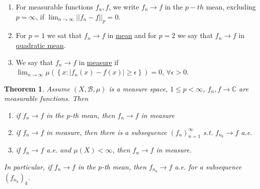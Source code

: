 \documentclass{article}
\newtheorem{theorem}{Theorem}[section]
\theoremstyle{definition}
\newcommand{\C}{\mathbb{C}}
\newcommand{\B}{\mathscr{B}}
\begin{document}
\begin{enumerate}
    \item For measurable functions $f_n,f$, we write $f_n\rightarrow f$ in the $p-th$ mean, excluding $p=\infty$, if $\lim_{n\rightarrow\infty}||f_n-f||_p=0$.
    \item For $p=1$ we sat that $f_n\rightarrow f$ in \underline{mean} and for $p=2$ we say that $f_n\rightarrow f$ in \underline{quadratic mean}.
    \item We say that $f_n\rightarrow f$ in \underline{measure} if $\lim_{n\rightarrow\infty}\mu(\left\{x:|f_n(x)-f(x)|\geq \epsilon\right\})=0$, $\forall \epsilon>0$.
\end{enumerate}

\begin{theorem}
    Assume $(X,\B,\mu)$ is a measure space, $1\leq p<\infty$, $f_n,f\rightarrow \C$ are measurable functions. Then
    \begin{enumerate}
        \item if $f_n\rightarrow f$ in the $p$-th mean, then $f_n\rightarrow f$ in measure 
        \item if $f_n\rightarrow f$ in measure, then there is a subsequence $(f_n)_{n=1}^\infty$ s.t. $f_{n_k}\rightarrow f$ a.e.
        \item if $f_n\rightarrow f$ a.e. and $\mu(X)<\infty$, then $f_n\rightarrow f$ in measure.
    \end{enumerate}
    In particular, if $f_n\rightarrow f$ in the $p$-th mean, then $f_{n_k}\rightarrow f$ a.e. for a subsequence $(f_{n_k})_k$.
\end{theorem}
\end{document}
